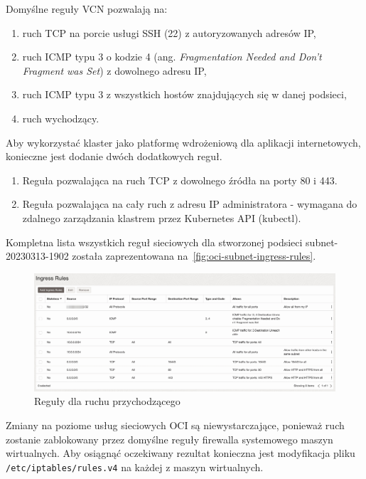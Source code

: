 \noindent Domyślne reguły VCN\cite{oci-security-lists} pozwalają na:
\begin{enumerate}
    \item ruch TCP na porcie usługi SSH (22) z autoryzowanych adresów IP\@,
    \item ruch ICMP typu 3 o kodzie 4 (ang. \emph{Fragmentation Needed and Don't Fragment was Set}) z dowolnego adresu IP,
    \item ruch ICMP typu 3 z wszystkich hostów znajdujących się w danej podsieci,
    \item ruch wychodzący.
\end{enumerate}

\noindent Aby wykorzystać klaster jako platformę wdrożeniową dla aplikacji internetowych, konieczne jest dodanie dwóch dodatkowych reguł.

\begin{enumerate}
    \item Reguła pozwalająca na ruch TCP z dowolnego źródła na porty 80 i 443.
    \item Reguła pozwalająca na cały ruch z adresu IP administratora - wymagana do zdalnego zarządzania klastrem przez Kubernetes API (kubectl).
\end{enumerate}

\noindent Kompletna lista wszystkich reguł sieciowych dla stworzonej podsieci subnet-20230313-1902 została zaprezentowana na~\autoref{fig:oci-subnet-ingress-rules}.

\begin{figure}[H]
    \centering
    \includegraphics[width=\textwidth]{img/oci-subnet-ingress-rules}
    \caption{Reguły dla ruchu przychodzącego}
    \label{fig:oci-subnet-ingress-rules}
\end{figure}

Zmiany na poziome usług sieciowych OCI są niewystarczające, ponieważ ruch zostanie zablokowany przez domyślne reguły firewalla systemowego maszyn wirtualnych.
Aby osiągnąć oczekiwany rezultat konieczna jest modyfikacja pliku \texttt{/etc/iptables/rules.v4} na każdej z maszyn wirtualnych.

